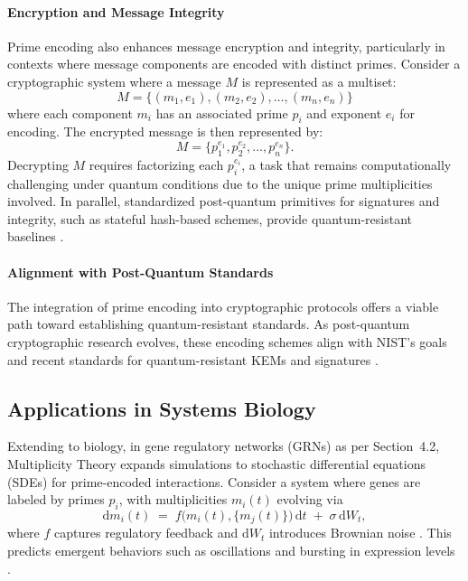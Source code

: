 \documentclass{article}
\theoremstyle{plain}
\begin{document}
\begin{enumerate}
\paragraph{Encryption and Message Integrity}
Prime encoding also enhances message encryption and integrity, particularly in contexts where message components are encoded with distinct primes. Consider a cryptographic system where a message $M$ is represented as a multiset:
\begin{equation}
M = \{(m_1, e_1), (m_2, e_2), \ldots, (m_n, e_n)\}
\end{equation}
where each component $m_i$ has an associated prime $p_i$ and exponent $e_i$ for encoding. The encrypted message is then represented by:
\begin{equation}
M = \{p_1^{e_1}, p_2^{e_2}, \ldots, p_n^{e_n}\}.
\end{equation}
Decrypting $M$ requires factorizing each $p_i^{e_i}$, a task that remains computationally challenging under quantum conditions due to the unique prime multiplicities involved. In parallel, standardized post-quantum primitives for signatures and integrity, such as stateful hash-based schemes, provide quantum-resistant baselines \citep{SP800-208}.

\paragraph{Alignment with Post-Quantum Standards}
The integration of prime encoding into cryptographic protocols offers a viable path toward establishing quantum-resistant standards. As post-quantum cryptographic research evolves, these encoding schemes align with NIST’s goals and recent standards for quantum-resistant KEMs and signatures \citep{NISTPQC2024,FIPS203,FIPS204,SP800-208}.


\subsection{Applications in Systems Biology}

Extending to biology, in gene regulatory networks (GRNs) as per Section~4.2, Multiplicity Theory expands simulations to stochastic differential equations (SDEs) for prime-encoded interactions. Consider a system where genes are labeled by primes $p_i$, with multiplicities $m_i(t)$ evolving via
\begin{equation}
\mathrm{d}m_i(t) \;=\; f\!\bigl(m_i(t),\{m_j(t)\}\bigr)\,\mathrm{d}t \;+\; \sigma\,\mathrm{d}W_t,
\end{equation}
where $f$ captures regulatory feedback and $\mathrm{d}W_t$ introduces Brownian noise \citep{Gardiner2009,vanKampen2007}. This predicts emergent behaviors such as oscillations and bursting in expression levels \citep{Paulsson2005,RajvanOudenaarden2008,Alon2007}. 


\end{enumerate}
\end{document}
